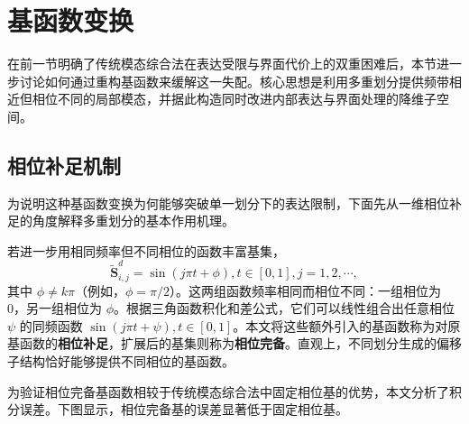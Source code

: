 \section{基函数变换}\label{sec:interface-modes}

在前一节明确了传统模态综合法在表达受限与界面代价上的双重困难后，本节进一步讨论如何通过重构基函数来缓解这一失配。核心思想是利用多重划分提供频带相近但相位不同的局部模态，并据此构造同时改进内部表达与界面处理的降维子空间。

\subsection{相位补足机制}

为说明这种基函数变换为何能够突破单一划分下的表达限制，下面先从一维相位补足的角度解释多重划分的基本作用机理。

若进一步用相同频率但不同相位的函数丰富基集，
\begin{equation}
  \tilde{\mathbf{S}}^d_{i,j} = \sin\left(j\pi t+\phi\right), t\in[0,1], j=1,2,\cdots,
  \label{eq:phase-complete-basis}
\end{equation}
其中 $\phi \neq k\pi$（例如，$\phi=\pi/2$）。这两组函数频率相同而相位不同：一组相位为 0，另一组相位为 $\phi$。根据三角函数积化和差公式，它们可以线性组合出任意相位 $\psi$ 的同频函数 $\sin(j\pi t+\psi), t\in[0,1]$。本文将这些额外引入的基函数称为对原基函数的\textbf{相位补足}，扩展后的基集则称为\textbf{相位完备}。直观上，不同划分生成的偏移子结构恰好能够提供不同相位的基函数。

为验证相位完备基函数相较于传统模态综合法中固定相位基的优势，本文分析了积分误差。\textcolor{ConclusionEvidence}{下图显示，相位完备基的误差显著低于固定相位基。}


